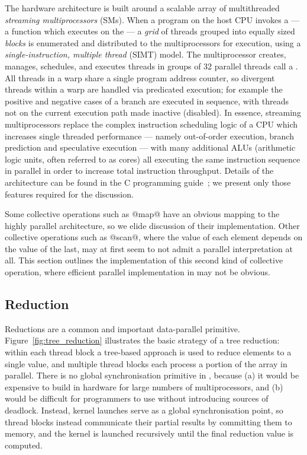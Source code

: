 The \CUDA hardware architecture is built around a scalable array of
multithreaded \emph{streaming multiprocessors} (SMs). When a \CUDA program on the
host CPU invokes a  --- a function which executes on the \GPU
--- a \emph{grid} of threads grouped into equally sized \emph{blocks} is
enumerated and distributed to the multiprocessors for execution, using a
\emph{single-instruction, multiple thread} (SIMT) model. The
multiprocessor creates, manages, schedules, and executes threads in groups of 32
parallel threads call a . All threads in a warp share a single
program address counter, so divergent threads within a warp are handled via
predicated execution; for example the positive and negative cases of a branch
are executed in sequence, with threads not on the current execution path made
inactive (disabled). In essence, streaming multiprocessors replace the complex
instruction scheduling logic of a CPU which increases single threaded
performance --- namely out-of-order execution, branch prediction and speculative
execution --- with many additional ALUs (arithmetic logic units, often referred
to as \CUDA cores) all executing the same instruction sequence in parallel in
order to increase total instruction throughput. Details of the \CUDA
architecture can be found in the \CUDA C programming
guide~\cite{NVIDIA:2012wf}; we present only those features required for the
discussion.

Some collective operations such as @map@ have an obvious mapping to the
highly parallel \CUDA architecture, so we elide discussion of their
implementation. Other collective operations such as @scan@, where the value
of each element depends on the value of the last, may at first seem to not admit
a parallel interpretation at all. This section outlines the implementation of
this second kind of collective operation, where efficient parallel
implementation in \CUDA may not be obvious.


\subsection{Reduction}
\label{sec:parallel_reduction}

Reductions are a common and important data-parallel primitive.
Figure~\ref{fig:tree_reduction} illustrates the basic strategy of a tree
reduction: within each thread block a tree-based approach is used to reduce
elements to a single value, and multiple thread blocks each process a portion of
the array in parallel. There is no global synchronisation primitive in \CUDA,
because (a) it would be expensive to build in hardware for large numbers of
multiprocessors, and (b) would be difficult for programmers to use without
introducing sources of deadlock. Instead, kernel launches serve as a global
synchronisation point, so thread blocks instead communicate their partial
results by committing them to memory, and the kernel is launched recursively
until the final reduction value is computed.

